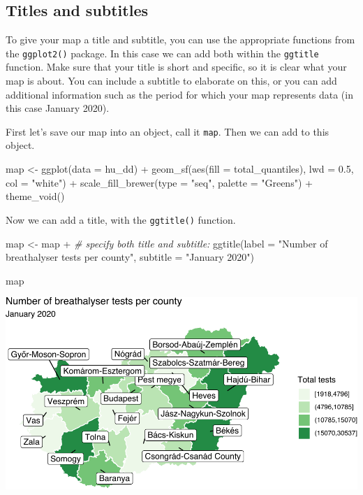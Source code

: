 \documentclass[
  krantz2]{krantz}
\makeatletter
\newenvironment{Shaded}{\begin{snugshade}}{\end{snugshade}}
\newcommand{\AttributeTok}[1]{\textcolor[rgb]{0.61,0.61,0.61}{#1}}
\newcommand{\CommentTok}[1]{\textcolor[rgb]{0.37,0.37,0.37}{\textit{#1}}}
\newcommand{\FloatTok}[1]{\textcolor[rgb]{0.06,0.06,0.06}{#1}}
\newcommand{\FunctionTok}[1]{\textcolor[rgb]{0,0,0}{#1}}
\newcommand{\NormalTok}[1]{#1}
\newcommand{\OtherTok}[1]{\textcolor[rgb]{0.37,0.37,0.37}{#1}}
\newcommand{\SpecialCharTok}[1]{\textcolor[rgb]{0,0,0}{#1}}
\newcommand{\StringTok}[1]{\textcolor[rgb]{0.5,0.5,0.5}{#1}}
\newenvironment{kframe}{%
\medskip{}
\setlength{\fboxsep}{.8em}
 \def\at@end@of@kframe{}%
 \ifinner\ifhmode%
  \def\at@end@of@kframe{\end{minipage}}%
  \begin{minipage}{\columnwidth}%
 \fi\fi%
 \def\FrameCommand##1{\hskip\@totalleftmargin \hskip-\fboxsep
 \colorbox{shadecolor}{##1}\hskip-\fboxsep
     \hskip-\linewidth \hskip-\@totalleftmargin \hskip\columnwidth}%
 \MakeFramed {\advance\hsize-\width
   \@totalleftmargin\z@ \linewidth\hsize
   \@setminipage}}%
 {\par\unskip\endMakeFramed%
 \at@end@of@kframe}
\renewenvironment{Shaded}{\begin{kframe}}{\end{kframe}}
\makeatother
\begin{document}
\hypertarget{titles-and-subtitles}{%
\subsection{Titles and subtitles}\label{titles-and-subtitles}}

To give your map a title and subtitle, you can use the appropriate functions from the \texttt{ggplot2()} package. In this case we can add both within the \texttt{ggtitle} function. Make sure that your title is short and specific, so it is clear what your map is about. You can include a subtitle to elaborate on this, or you can add additional information such as the period for which your map represents data (in this case January 2020).

First let's save our map into an object, call it \texttt{map}. Then we can add to this object.

\begin{Shaded}
\begin{Highlighting}[]
\NormalTok{map }\OtherTok{\textless{}{-}} \FunctionTok{ggplot}\NormalTok{(}\AttributeTok{data =}\NormalTok{ hu\_dd) }\SpecialCharTok{+} 
  \FunctionTok{geom\_sf}\NormalTok{(}\FunctionTok{aes}\NormalTok{(}\AttributeTok{fill =}\NormalTok{ total\_quantiles), }
          \AttributeTok{lwd =} \FloatTok{0.5}\NormalTok{, }\AttributeTok{col =} \StringTok{"white"}\NormalTok{) }\SpecialCharTok{+} 
  \FunctionTok{scale\_fill\_brewer}\NormalTok{(}\AttributeTok{type =} \StringTok{"seq"}\NormalTok{, }\AttributeTok{palette =} \StringTok{"Greens"}\NormalTok{) }\SpecialCharTok{+} 
  \FunctionTok{theme\_void}\NormalTok{() }
\end{Highlighting}
\end{Shaded}

Now we can add a title, with the \texttt{ggtitle()} function.

\begin{Shaded}
\begin{Highlighting}[]
\NormalTok{map }\OtherTok{\textless{}{-}}\NormalTok{ map }\SpecialCharTok{+} 
  \CommentTok{\# specify both title and subtitle: }
  \FunctionTok{ggtitle}\NormalTok{(}\AttributeTok{label =} \StringTok{"Number of breathalyser tests per county"}\NormalTok{, }
          \AttributeTok{subtitle =} \StringTok{"January 2020"}\NormalTok{)}

\NormalTok{map}
\end{Highlighting}
\end{Shaded}

\includegraphics{crime_mapping_files/figure-latex/unnamed-chunk-160-1.pdf}
\end{document}
